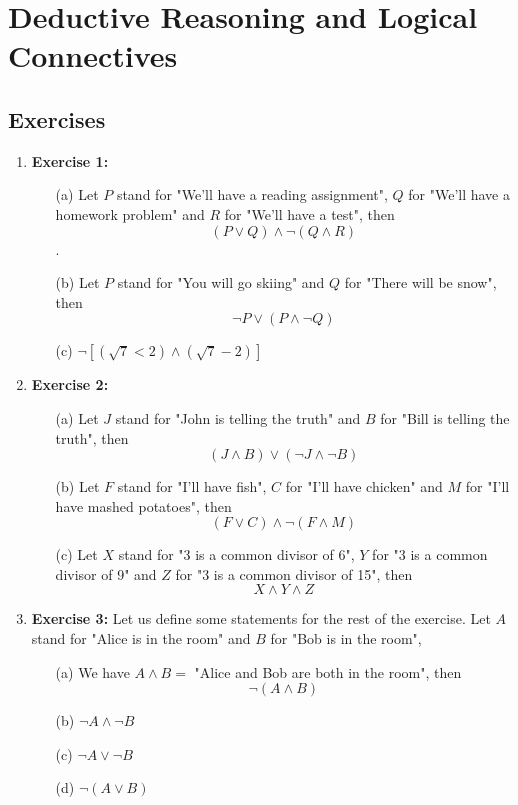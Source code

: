 \documentclass{article} %
\begin{document}
    \section{Deductive Reasoning and Logical Connectives} %
    
    \subsection*{Exercises} %
    
    \begin{enumerate}
        \item \textbf{Exercise 1:}
        \begin{itemize}
            \item[(a)] Let \(P\) stand for "We'll have a reading assignment", \(Q\) for "We'll have a homework problem" and \(R\) for "We'll have a test", then \[(P \vee Q) \wedge \neg (Q \wedge R)\].
            \item[(b)] Let \(P\) stand for "You will go skiing" and \(Q\) for "There will be snow", then \[\neg P \vee (P \wedge \neg Q)\]
            \item[(c)] \( \neg [(\sqrt{7} < 2) \wedge (\sqrt{7} - 2)] \)
        \end{itemize} 

        \item \textbf{Exercise 2:}
        \begin{itemize}
            \item[(a)] Let \(J\) stand for "John is telling the truth" and \(B\) for "Bill is telling the truth", then \[(J \wedge B) \vee (\neg J \wedge \neg B)\]
            \item[(b)] Let \(F\) stand for "I'll have fish", \(C\) for "I'll have chicken" and \(M\) for "I'll have mashed potatoes", then \[(F \vee C) \wedge \neg (F \wedge M)\]
            \item[(c)] Let \(X\) stand for "3 is a common divisor of 6", \(Y\) for "3 is a common divisor of 9" and \(Z\) for "3 is a common divisor of 15", then \[X \wedge Y \wedge Z\]
        \end{itemize}

        \item \textbf{Exercise 3:}
        Let us define some statements for the rest of the exercise. Let \(A\) stand for "Alice is in the room" and \(B\) for "Bob is in the room",
        \begin{itemize}
            \item[(a)] We have \(A \wedge B = \) "Alice and Bob are both in the room", then \[\neg (A \wedge B)\]
            \item[(b)] \(\neg A \wedge \neg B\)
            \item[(c)] \(\neg A \vee \neg B\)
            \item[(d)] \(\neg (A \vee B)\)
        \end{itemize}


\end{enumerate}
\end{document}
